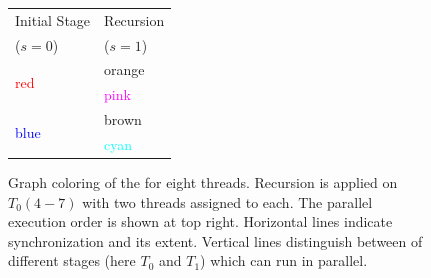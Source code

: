 \begin{figure}[thbp]
\begin{minipage}[c]{0.4\textwidth}
	       	\begin{tabular}{l|l}
	       		{Initial Stage} & {Recursion}\\
	       		{($s=0$)} & {($s=1$)}\\
	       		\midrule
	       	   \multirow{2}{*}{\textcolor{red}{red}} & {\textcolor{amber}{orange}}\\
	       	   \cmidrule(lr){2-2}
	       		& {\textcolor{magenta}{pink}}\\
	       		\midrule
	       	   \multirow{2}{*}{\textcolor{blue}{blue}} & {\textcolor{carmine}{brown}}\\
	       	   \cmidrule(lr){2-2}
	       	   & {\textcolor{cyan}{cyan}}\\
	       	   \bottomrule
	       	\end{tabular}
       		\caption{Graph coloring of the \stex for eight threads. Recursion is applied on \levelGroups $T_0(4-7)$ with two threads assigned to each. The parallel execution order is shown at top right.  Horizontal lines indicate synchronization and its extent. Vertical lines distinguish between \levelGroups of different stages (here $T_0$ and $T_1$) which can run in parallel. 
		}
       		\label{fig:rec_2d-7pt_graph}
       	\end{minipage}
       \end{figure}
     
          
